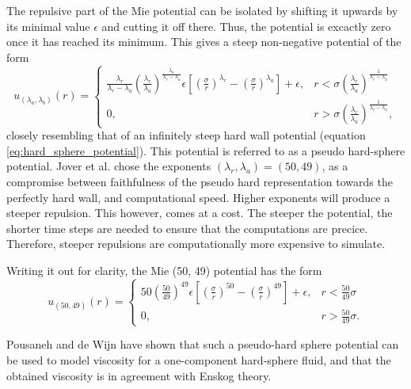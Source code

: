The repulsive part of the Mie potential can be isolated by shifting it 
upwards by its minimal value $\epsilon$ and cutting it off there. 
Thus, the potential is excactly zero once it has reached its minimum.
This gives a steep non-negative potential of the form
\begin{equation}
    u_{(\lambda_a, \lambda_b)}(r) = 
    \begin{cases}
        \frac{\lambda_r}{\lambda_r - \lambda_a}
        \left(\frac{\lambda_r}{\lambda_a}\right)
        ^{\frac{\lambda_a}{\lambda_r - \lambda_a}}
        \epsilon \left[
            \left(\frac{\sigma}{r}\right)^{\lambda_r} -
            \left(\frac{\sigma}{r}\right)^{\lambda_a}
        \right]
        + \epsilon,
            & r < \sigma \left(
                \frac{\lambda_r}{\lambda_a}
            \right)^\frac{1}{\lambda_r - \lambda_a} \\
        0,  & r > \sigma \left(
                \frac{\lambda_r}{\lambda_a}
            \right)^\frac{1}{\lambda_r - \lambda_a},
    \end{cases}
\end{equation}
closely resembling that of an infinitely steep hard wall potential (equation \ref{eq:hard_sphere_potential}).
This potential is referred to as a pseudo hard-sphere potential.
Jover et al. chose the exponents $(\lambda_r, \lambda_a) = (50, 49)$, 
as a compromise between faithfulness of the pseudo hard representation 
towards the perfectly hard wall, and computational speed.
Higher exponents will produce a steeper repulsion. 
This however, comes at a cost. 
The steeper the potential, the shorter time steps are needed to ensure that the computations are precice.
Therefore, steeper repulsions are computationally more expensive to simulate.

Writing it out for clarity, the Mie (50, 49) potential has the form
\begin{equation}
    u_{(50, 49)}(r) = 
    \begin{cases}
        50
        \left(\frac{50}{49}\right)
        ^{49}
        \epsilon \left[
            \left(\frac{\sigma}{r}\right)^{50} -
            \left(\frac{\sigma}{r}\right)^{49}
        \right]
        + \epsilon,
            & r < \frac{50}{49} \sigma\\
        0,  & r > \frac{50}{49} \sigma.
    \end{cases}
\end{equation}

Pousaneh and de Wijn \cite{ref:pousaneh:shear_viscosity} 
have shown that such a pseudo-hard sphere potential 
can be used to model viscosity for a one-component hard-sphere fluid, 
and that the obtained viscosity is in agreement with Enskog theory.

